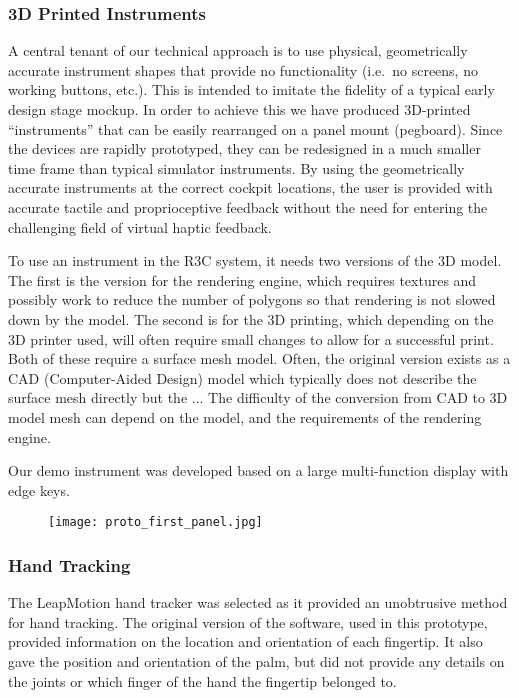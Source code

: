\subsubsection{3D Printed Instruments}

A central tenant of our technical approach is to use physical, geometrically accurate instrument shapes that provide no functionality (i.e.\ no screens, no working buttons, etc.).
This is intended to imitate the fidelity of a typical early design stage mockup.
In order to achieve this we have produced 3D-printed ``instruments'' that can be easily rearranged on a panel mount (pegboard).
Since the devices are rapidly prototyped, they can be redesigned in a much smaller time frame than typical simulator instruments.
By using the geometrically accurate instruments at the correct cockpit locations, the user is provided with accurate tactile and proprioceptive feedback without the need for entering the challenging field of virtual haptic feedback.

To use an instrument in the R3C system, it needs two versions of the 3D model.
The first is the version for the rendering engine, which requires textures and possibly work to reduce the number of polygons so that rendering is not slowed down by the model.
The second is for the 3D printing, which depending on the 3D printer used, will often require small changes to allow for a successful print.
Both of these require a surface mesh model.
Often, the original version exists as a CAD (Computer-Aided Design) model which typically does not describe the surface mesh directly but the ...
The difficulty of the conversion from CAD to 3D model mesh can depend on the model, and the requirements of the rendering engine.

Our demo instrument was developed based on a large multi-function display with edge keys.

\begin{figure}
    \centering
    \texttt{[image: proto\_first\_panel.jpg]}
    \caption{}
    \label{fig:proto_first_panel}
\end{figure}


\subsubsection{Hand Tracking}

The LeapMotion hand tracker was selected as it provided an unobtrusive method for hand tracking.
The original version of the software, used in this prototype, provided information on the location and orientation of each fingertip.
It also gave the position and orientation of the palm, but did not provide any details on the joints or which finger of the hand the fingertip belonged to.

